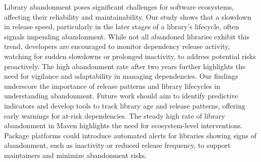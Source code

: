 Library abandonment poses significant challenges for software ecosystems, affecting their reliability and maintainability. Our study shows that a slowdown in release speed, particularly in the later stages of a library's lifecycle, often signals impending abandonment. While not all abandoned libraries exhibit this trend, developers are encouraged to monitor dependency release activity, watching for sudden slowdowns or prolonged inactivity, to address potential risks proactively. The high abandonment rate after two years further highlights the need for vigilance and adaptability in managing dependencies. Our findings underscore the importance of release patterns and library lifecycles in understanding abandonment. Future work should aim to identify predictive indicators and develop tools to track library age and release patterns, offering early warnings for at-risk dependencies. The steady high rate of library abandonment in Maven highlights the need for ecosystem-level interventions. Package platforms could introduce automated alerts for libraries showing signs of abandonment, such as inactivity or reduced release frequency, to support maintainers and minimize abandonment risks.


